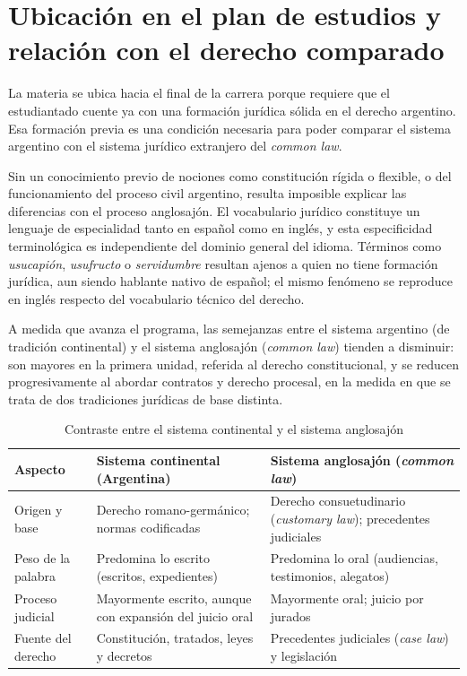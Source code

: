 \documentclass[12pt,oneside]{book}
\begin{document}
\section{Ubicación en el plan de estudios y relación con el derecho comparado}

La materia se ubica hacia el final de la carrera porque requiere que el estudiantado cuente ya con una formación jurídica sólida en el derecho argentino. Esa formación previa es una condición necesaria para poder comparar el sistema argentino con el sistema jurídico extranjero del \textit{common law}.

Sin un conocimiento previo de nociones como constitución rígida o flexible, o del funcionamiento del proceso civil argentino, resulta imposible explicar las diferencias con el proceso anglosajón. El vocabulario jurídico constituye un lenguaje de especialidad tanto en español como en inglés, y esta especificidad terminológica es independiente del dominio general del idioma. Términos como \textit{usucapión}, \textit{usufructo} o \textit{servidumbre} resultan ajenos a quien no tiene formación jurídica, aun siendo hablante nativo de español; el mismo fenómeno se reproduce en inglés respecto del vocabulario técnico del derecho.

A medida que avanza el programa, las semejanzas entre el sistema argentino (de tradición continental) y el sistema anglosajón (\textit{common law}) tienden a disminuir: son mayores en la primera unidad, referida al derecho constitucional, y se reducen progresivamente al abordar contratos y derecho procesal, en la medida en que se trata de dos tradiciones jurídicas de base distinta.

\begin{table}[H]
\centering
\caption{Contraste entre el sistema continental y el sistema anglosajón}
\begin{tabularx}{\textwidth}{>{\raggedright\arraybackslash}p{} >{\raggedright\arraybackslash}X >{\raggedright\arraybackslash}X}
\toprule
\textbf{Aspecto} & \textbf{Sistema continental (Argentina)} & \textbf{Sistema anglosajón (\textit{common law})} \\
\midrule
Origen y base & Derecho romano-germánico; normas codificadas & Derecho consuetudinario (\textit{customary law}); precedentes judiciales \\
Peso de la palabra & Predomina lo escrito (escritos, expedientes) & Predomina lo oral (audiencias, testimonios, alegatos) \\
Proceso judicial & Mayormente escrito, aunque con expansión del juicio oral & Mayormente oral; juicio por jurados \\
Fuente del derecho & Constitución, tratados, leyes y decretos & Precedentes judiciales (\textit{case law}) y legislación \\
\bottomrule
\end{tabularx}
\end{table}
\end{document}
